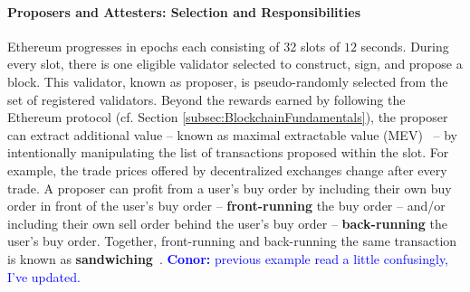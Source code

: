 \documentclass[a4paper]{article}
\theoremstyle{boldstyle}
\newcommand{\cm}[1]{\textcolor{blue}{\textbf{Conor:} #1}}
\begin{document}
    \paragraph{Proposers and Attesters: Selection and Responsibilities}
Ethereum progresses in epochs each consisting of 32 slots of $12$ seconds. During every slot, there is one eligible validator selected to construct, sign, and propose a block. This validator, known as proposer, is pseudo-randomly selected from the set of registered validators. Beyond the rewards earned by following the Ethereum protocol (cf. Section \ref{subsec:BlockchainFundamentals}), the proposer can extract additional value -- known as maximal extractable value (MEV)~\cite{W:MaximalExtractableValueMEV} -- by intentionally manipulating the list of transactions proposed within the slot. For example, the trade prices offered by decentralized exchanges change after every trade. A proposer can profit from a user's buy order by including their own buy order in front of the user's buy order -- \textbf{front-running} the buy order -- and/or including their own sell order behind the user's buy order -- \textbf{back-running} the user's buy order. Together, front-running and back-running the same transaction is known as \textbf{sandwiching}~\cite{W:MaximalExtractableValueMEV}. \cm{previous example read a little confusingly, I've updated.}
\end{document}
